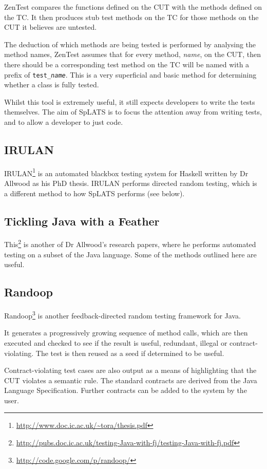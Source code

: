     ZenTest compares the functions defined on the CUT with the methods defined
on the TC. It then produces stub test methods on the TC for those methods on the
CUT it believes are untested.

    The deduction of which methods are being tested is performed by analysing
the method names, ZenTest assumes that for every method, \emph{name}, on the
CUT, then there should be a corresponding test method on the TC will be named
with a prefix of \texttt{test\_\emph{name}}. This is a very superficial and
basic method for determining whether a class is fully tested.

    Whilst this tool is extremely useful, it still expects developers to write
the tests themselves. The aim of SpLATS is to focus the attention away from
writing tests, and to allow a developer to just code.

  \subsection{IRULAN}
    IRULAN\footnote{\url{http://www.doc.ic.ac.uk/~tora/thesis.pdf}} is an automated blackbox testing system for Haskell written by Dr Allwood as his PhD thesis.
    IRULAN performs directed random testing, which is a different method to how SpLATS performs (see below).

  \subsection{Tickling Java with a Feather}
    This\footnote{\url{http://pubs.doc.ic.ac.uk/testing-Java-with-fj/testing-Java-with-fj.pdf}} is another of Dr Allwood's research papers, where he performs automated testing on a subset of the Java language.
    Some of the methods outlined here are useful.

  \subsection{Randoop}
    Randoop\footnote{\url{http://code.google.com/p/randoop/}} is another
feedback-directed random testing framework for Java.

    It generates a progressively growing sequence of method calls, which are
then executed and checked to see if the result is useful, redundant, illegal or
contract-violating. The test is then reused as a seed if determined to be
useful.

    Contract-violating test cases are also output as a means of highlighting
that the CUT violates a semantic rule. The standard contracts are derived from
the Java Language Specification. Further contracts can be added to the system by
the user.

